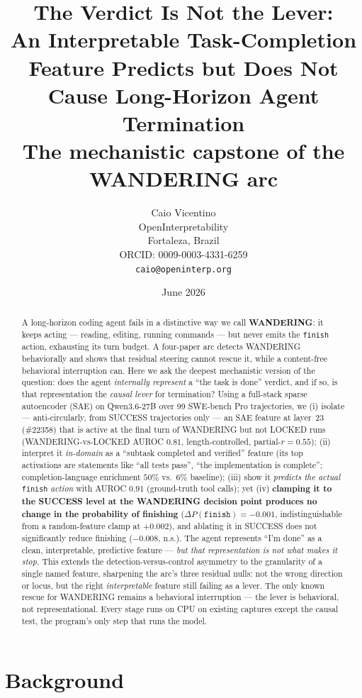 \documentclass[11pt]{article}
\title{The Verdict Is Not the Lever: \\
An Interpretable Task-Completion Feature Predicts but Does Not \\
Cause Long-Horizon Agent Termination \\[2pt]
\large The mechanistic capstone of the WANDERING arc}
\author{%
  Caio Vicentino \\
  OpenInterpretability \\
  Fortaleza, Brazil \\
  ORCID: 0009-0003-4331-6259 \\
  \texttt{caio@openinterp.org}%
}
\date{June 2026}
\begin{document}
\maketitle

\begin{abstract}
A long-horizon coding agent fails in a distinctive way we call \textbf{WANDERING}: it keeps acting --- reading, editing, running commands --- but never emits the \texttt{finish} action, exhausting its turn budget. A four-paper arc detects WANDERING behaviorally and shows that residual steering cannot rescue it, while a content-free behavioral interruption can. Here we ask the deepest mechanistic version of the question: does the agent \emph{internally represent} a ``the task is done'' verdict, and if so, is that representation the \emph{causal lever} for termination? Using a full-stack sparse autoencoder (SAE) on Qwen3.6-27B over 99 SWE-bench Pro trajectories, we (i) isolate --- anti-circularly, from SUCCESS trajectories only --- an SAE feature at layer~23 (\#22358) that is active at the final turn of WANDERING but not LOCKED runs (WANDERING-vs-LOCKED AUROC $0.81$, length-controlled, partial-$r=0.55$); (ii) interpret it \emph{in-domain} as a ``subtask completed and verified'' feature (its top activations are statements like ``all tests pass'', ``the implementation is complete''; completion-language enrichment $50\%$ vs.\ $6\%$ baseline); (iii) show it \emph{predicts the actual} \texttt{finish} \emph{action} with AUROC $0.91$ (ground-truth tool calls); yet (iv) \textbf{clamping it to the SUCCESS level at the WANDERING decision point produces no change in the probability of finishing} ($\Delta P(\texttt{finish})=-0.001$, indistinguishable from a random-feature clamp at $+0.002$), and ablating it in SUCCESS does not significantly reduce finishing ($-0.008$, n.s.). The agent represents ``I'm done'' as a clean, interpretable, predictive feature --- \emph{but that representation is not what makes it stop.} This extends the detection-versus-control asymmetry to the granularity of a single named feature, sharpening the arc's three residual nulls: not the wrong direction or locus, but the right \emph{interpretable} feature still failing as a lever. The only known rescue for WANDERING remains a behavioral interruption --- the lever is behavioral, not representational. Every stage runs on CPU on existing captures except the causal test, the program's only step that runs the model.
\end{abstract}

\section{Background}\label{sec:background}
\end{document}

